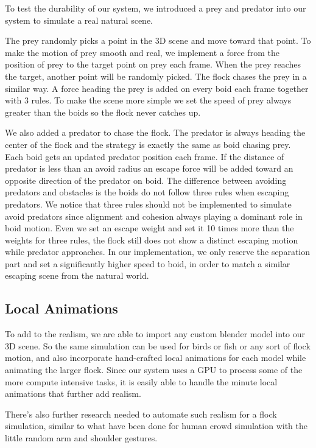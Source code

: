 To test the durability of our system, we introduced a prey and predator into our system to simulate a real natural scene.

The prey randomly picks a point in the 3D scene and move toward that point. To make the motion of prey smooth and real, we implement a force from the position of prey to the target point on prey each frame. When the prey reaches the target, another point will be randomly picked. The flock chases the prey in a similar way. A force heading the prey is added on every boid each frame together with 3 rules. To make the scene more simple we set the speed of prey always greater than the boids so the flock never catches up. 

We also added a predator to chase the flock. The predator is always heading the center of the flock and the strategy is exactly the same as boid chasing prey. Each boid gets an updated predator position each frame. If the distance of predator is less than an avoid radius an escape force will be added toward an opposite direction of the predator on boid. The difference between avoiding predators and obstacles is the boids do not follow three rules when escaping predators. We notice that three rules should not be implemented to simulate avoid predators since alignment and cohesion always playing a dominant role in boid motion. Even we set an escape weight and set it 10 times more than the weights for three rules, the flock still does not show a distinct escaping motion while predator approaches. In our implementation, we only reserve the separation part and set a significantly higher speed to boid, in order to match a similar escaping scene from the natural world.

\subsection{Local Animations}

To add to the realism, we are able to import any custom blender model into our 3D scene. So the same simulation can be used for birds or fish or any sort of flock motion, and also incorporate hand-crafted local animations for each model while animating the larger flock. Since our system uses a GPU to process some of the more compute intensive tasks, it is easily able to handle the minute local animations that further add realism.

There's also further research needed to automate such realism for a flock simulation, similar to what have been done for human crowd simulation with the little random arm and shoulder gestures.